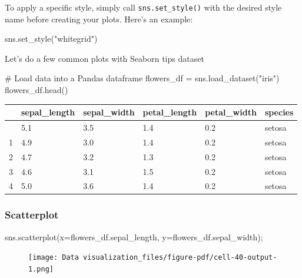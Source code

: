 \documentclass[
  letterpaper,
  DIV=11,
  numbers=noendperiod]{scrreprt}
\newenvironment{Shaded}{\begin{snugshade}}{\end{snugshade}}
\newcommand{\CommentTok}[1]{\textcolor[rgb]{0.37,0.37,0.37}{#1}}
\newcommand{\NormalTok}[1]{\textcolor[rgb]{0.00,0.23,0.31}{#1}}
\newcommand{\OperatorTok}[1]{\textcolor[rgb]{0.37,0.37,0.37}{#1}}
\newcommand{\StringTok}[1]{\textcolor[rgb]{0.13,0.47,0.30}{#1}}
\begin{document}
To apply a specific style, simply call \texttt{sns.set\_style()} with
the desired style name before creating your plots. Here's an example:

\begin{Shaded}
\begin{Highlighting}[]
\NormalTok{sns.set\_style(}\StringTok{"whitegrid"}\NormalTok{)}
\end{Highlighting}
\end{Shaded}

Let's do a few common plots with Seaborn tips dataset

\begin{Shaded}
\begin{Highlighting}[]
\CommentTok{\# Load data into a Pandas dataframe}
\NormalTok{flowers\_df }\OperatorTok{=}\NormalTok{ sns.load\_dataset(}\StringTok{"iris"}\NormalTok{)}
\NormalTok{flowers\_df.head()}
\end{Highlighting}
\end{Shaded}

\begin{longtable}[]{@{}llllll@{}}
\toprule\noalign{}
& sepal\_length & sepal\_width & petal\_length & petal\_width &
species \\
\midrule\noalign{}
\endhead
\bottomrule\noalign{}
\endlastfoot
0 & 5.1 & 3.5 & 1.4 & 0.2 & setosa \\
1 & 4.9 & 3.0 & 1.4 & 0.2 & setosa \\
2 & 4.7 & 3.2 & 1.3 & 0.2 & setosa \\
3 & 4.6 & 3.1 & 1.5 & 0.2 & setosa \\
4 & 5.0 & 3.6 & 1.4 & 0.2 & setosa \\
\end{longtable}

\hypertarget{scatterplot}{%
\subsubsection{Scatterplot}\label{scatterplot}}

\begin{Shaded}
\begin{Highlighting}[]
\NormalTok{sns.scatterplot(x}\OperatorTok{=}\NormalTok{flowers\_df.sepal\_length, y}\OperatorTok{=}\NormalTok{flowers\_df.sepal\_width)}\OperatorTok{;}
\end{Highlighting}
\end{Shaded}

\begin{figure}[H]

{\centering \texttt{[image: Data visualization\_files/figure-pdf/cell-40-output-1.png]}

}

\end{figure}
\end{document}
